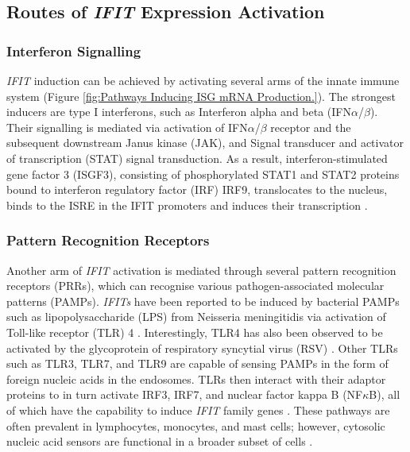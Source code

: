 \subsection{Routes of \textit{IFIT} Expression Activation} \label{subsec:Routes of IFIT Expression Activation}
\subsubsection{Interferon Signalling} \label{Interferon Signalling}
\textit{IFIT} induction can be achieved by activating several arms of the innate immune system (Figure \ref{fig:Pathways Inducing ISG mRNA Production.}). The strongest inducers are type I interferons, such as Interferon alpha and beta (IFN\(\alpha\)/\(\beta\)).  Their signalling is mediated via activation of IFN\(\alpha\)/\(\beta\) receptor and the subsequent downstream Janus kinase (JAK), and Signal transducer and activator of transcription (STAT) signal transduction. As a result, interferon-stimulated gene factor 3 (ISGF3), consisting of phosphorylated STAT1 and STAT2 proteins bound to interferon regulatory factor (IRF) IRF9, translocates to the nucleus, binds to the ISRE in the IFIT promoters and induces their transcription \cite{Der1998IdentificationArrays, Mesev2019DecodingInfection, Schoggins2011Interferon-stimulatedFunctions}. 

\subsubsection{Pattern Recognition Receptors} \label{Pattern Recognition Receptors}
Another arm of \textit{IFIT} activation is mediated through several pattern recognition receptors (PRRs), which can recognise various pathogen-associated molecular patterns (PAMPs). \textit{IFITs} have been reported to be induced by bacterial PAMPs such as lipopolysaccharide (LPS) from Neisseria meningitidis via activation of Toll-like receptor (TLR) 4 \cite{Zhou2013InterferonDefense.}. Interestingly, TLR4 has also been observed to be activated by the glycoprotein of respiratory syncytial virus (RSV) \cite{Funchal2015RespiratoryNeutrophils}. Other TLRs such as TLR3, TLR7, and TLR9 are capable of sensing PAMPs in the form of foreign nucleic acids in the endosomes. TLRs then interact with their adaptor proteins to in turn activate IRF3, IRF7, and nuclear factor kappa B (NF\(\kappa\)B), all of which have the capability to induce \textit{IFIT} family genes \cite{Diamond2013TheProteins}. These pathways are often prevalent in lymphocytes, monocytes, and mast cells; however, cytosolic nucleic acid sensors are functional in a broader subset of cells \cite{Ablasser2011WhereFit}.

